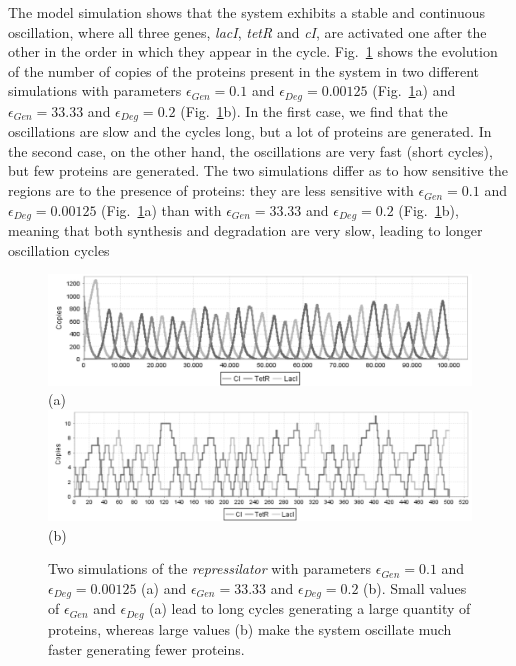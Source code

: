 \documentclass[runningheads,a4paper]{llncs}
\begin{document}
The model simulation shows that the system exhibits a stable and continuous oscillation, where all three genes, \textit{lacI}, \textit{tetR} and \textit{cI}, are activated one after the other in the order in which they appear in the cycle. Fig.~\ref{f:repress} shows the evolution of the number of copies of the proteins present in the system in two different simulations with parameters $\epsilon_{Gen} = 0.1$ and $\epsilon_{Deg} = 0.00125$ (Fig.~\ref{f:repress}a) and $\epsilon_{Gen} = 33.33$ and $\epsilon_{Deg} = 0.2$ (Fig.~\ref{f:repress}b). In the first case, we find that the oscillations are slow and the cycles long, but a lot of proteins are generated. In the second case, on the other hand, the oscillations are very fast (short cycles), but few proteins are generated. The two simulations differ as to how sensitive the regions are to the presence of proteins: they are less sensitive with $\epsilon_{Gen} = 0.1$ and $\epsilon_{Deg} = 0.00125$ (Fig.~\ref{f:repress}a) than with $\epsilon_{Gen} = 33.33$ and $\epsilon_{Deg} = 0.2$ (Fig.~\ref{f:repress}b), meaning that both synthesis and degradation are very slow, leading to longer oscillation cycles

\begin{figure}
\begin{center}
\includegraphics[width=1\textwidth]{repress1}
(a)
\includegraphics[width=1\textwidth]{repress2}
(b)
\caption{Two simulations of the \textit{repressilator} with parameters $\epsilon_{Gen} = 0.1$ and $\epsilon_{Deg} = 0.00125$ (a) and $\epsilon_{Gen} = 33.33$ and $\epsilon_{Deg} = 0.2$ (b). Small values of $\epsilon_{Gen}$ and $\epsilon_{Deg}$ (a) lead to long cycles generating a large quantity of proteins, whereas large values (b) make the system oscillate much faster generating fewer proteins.}
\label{f:repress}
\end{center}
\end{figure}
\end{document}
